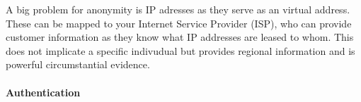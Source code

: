 A big problem for anonymity is IP adresses as they serve as an virtual
address. These can be mapped to your Internet Service Provider (ISP),
who can provide customer information as they know what IP addresses
are leased to whom. This does not implicate a specific indivudual but
provides regional information and is powerful circumstantial
evidence.



\paragraph{Authentication}








